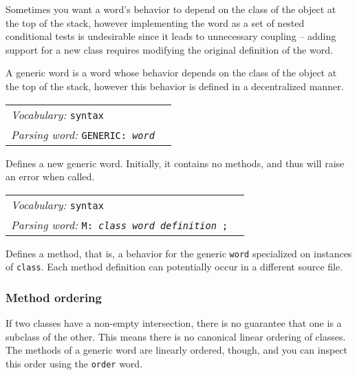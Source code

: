 \documentclass{book}
\newcommand{\vocabulary}[1]{\emph{Vocabulary:} \texttt{#1}&\\}
\newcommand{\parsingword}[2]{\index{\texttt{#1}}\emph{Parsing word:} \texttt{#2}&\\}
\newcommand{\wordtable}[1]{


\begin{tabularx}{12cm}{lX}
\hline
#1
\hline
\end{tabularx}

}
\begin{document}
Sometimes  you want a word's behavior to depend on the class of the object at the top of the stack, however implementing the word as a set of nested conditional tests is undesirable since it leads to unnecessary coupling -- adding support for a new class requires modifying the original definition of the word.

A generic word is a word whose behavior depends on the class of the
object at the top of the stack, however this behavior is defined in a
decentralized manner.

\wordtable{
\vocabulary{syntax}
\parsingword{GENERIC:}{GENERIC: \emph{word}}
}
Defines a new generic word. Initially, it contains no methods, and thus will raise an error when called.

\wordtable{
\vocabulary{syntax}
\parsingword{M:}{M: \emph{class} \emph{word} \emph{definition} ;}
}
Defines a method, that is, a behavior for the generic \texttt{word} specialized on instances of \texttt{class}. Each method definition
can potentially occur in a different source file.

\subsubsection{\label{method-order}Method ordering}

If two classes have a non-empty intersection, there is no guarantee that one is a subclass of the other. This means there is no canonical linear ordering of classes. The methods of a generic word are linearly ordered, though, and you can inspect this order using the \texttt{order} word.
\end{document}
